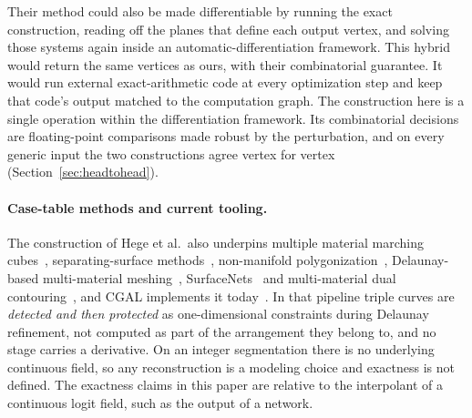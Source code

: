 \documentclass{egpubl}
\theoremstyle{definition}
\begin{document}
Their method could also be made differentiable by running the exact
construction, reading off the planes that define each output vertex, and
solving those systems again inside an automatic-differentiation framework.
This hybrid would return the same vertices as ours, with their combinatorial
guarantee. It would run external exact-arithmetic code at every optimization
step and keep that code's output matched to the computation graph. The
construction here is a single operation within the differentiation framework.
Its combinatorial decisions are floating-point comparisons made robust by the
perturbation, and on every generic input the two constructions agree vertex
for vertex (Section~\ref{sec:headtohead}).

\paragraph{Case-table methods and current tooling.} The construction of
Hege et al.\ also underpins multiple material marching cubes~\cite{wu2003}, separating-surface
methods~\cite{nielson1997}, non-manifold polygonization~\cite{bloomenthal1995},
Delaunay-based multi-material meshing~\cite{boltcheva2009},
SurfaceNets~\cite{frisken2022} and multi-material dual
contouring~\cite{mmdc2023}, and CGAL implements it today~\cite{cgalmesh3,
cgal2024}. In that pipeline triple curves are \emph{detected and then
protected} as one-dimensional constraints during Delaunay refinement, not
computed as part of the arrangement they belong to, and no stage carries a
derivative. On an integer segmentation there
is no underlying continuous field, so any reconstruction is a modeling choice
and exactness is not defined. The exactness claims in this paper are relative
to the interpolant of a continuous logit field, such as the output of a
network.
\end{document}
